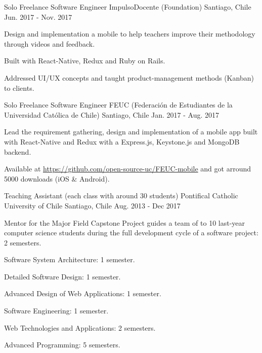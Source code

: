 \begin{cventries}
  \cventry
    {Solo Freelance Software Engineer}
    {ImpulsoDocente (Foundation)}
    {Santiago, Chile}
    {Jun. 2017 - Nov. 2017}
    {
      \begin{cvitems}
        \item {Design and implementation a mobile to help teachers improve their methodology through videos and feedback.}
        \item Built with React-Native, Redux and Ruby on Rails.
        \item {Addressed UI/UX concepts and taught product-management methods (Kanban) to clients.}
      \end{cvitems}
    }

  \cventry
    {Solo Freelance Software Engineer}
    {FEUC (Federación de Estudiantes de la Universidad Católica de Chile)}
    {Santiago, Chile}
    {Jan. 2017 - Aug. 2017}
    {
      \begin{cvitems}
        \item {Lead the requirement gathering, design and implementation of a mobile app built with React-Native and Redux with a Express.js, Keystone.js and MongoDB backend.}
        \item Available at \url{https://github.com/open-source-uc/FEUC-mobile} and got arround 5000 downloads (iOS \& Android).
      \end{cvitems}
    }
    
  \cventry
    {Teaching Assistant (each class with around 30 students)}
    {Pontifical Catholic University of Chile}
    {Santiago, Chile}
    {Aug. 2013 - Dec 2017}
    {
      \begin{cvitems}
        \item {Mentor for the Major Field Capstone Project guides a team of to 10 last-year computer science students during the full development cycle of a software project: 2 semesters.}
        \item {Software System Architecture: 1 semester.}
        \item {Detailed Software Design: 1 semester.}
        \item {Advanced Design of Web Applications: 1 semester.}
        \item {Software Engineering: 1 semester.}
        \item {Web Technologies and Applications: 2 semesters.}
        \item {Advanced Programming: 5 semesters.}
      \end{cvitems}
    }
    

\end{cventries}
